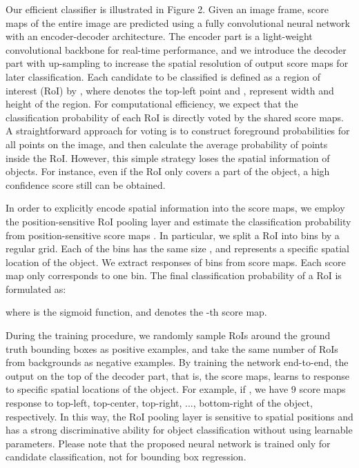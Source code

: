 \documentclass{article}
\begin{document}
Our efficient classifier is illustrated in Figure 2.
Given an image frame,
score maps of the entire image are predicted 
using a fully convolutional neural network with an encoder-decoder architecture.
The encoder part is a light-weight convolutional backbone for real-time performance,
and we introduce the decoder part with up-sampling to 
increase the spatial resolution of output score maps for later classification.
Each candidate to be classified is defined as a region of interest (RoI) by ,
where  denotes the top-left point and ,  represent width and height of the region.
For computational efficiency,
we expect that
the classification probability of each RoI is directly voted by the shared score maps.
A straightforward approach for voting is to construct foreground probabilities for all points on the image,
and then calculate the average probability of points inside the RoI.
However, this simple strategy loses the spatial information of objects.
For instance, even if the RoI only covers a part of the object,
a high confidence score still can be obtained.


In order to explicitly encode spatial information into the score maps, 
we employ the position-sensitive RoI pooling layer \cite{dai2016r}
and estimate the classification probability from  position-sensitive score maps .
In particular, we split a RoI into  bins by a regular grid.
Each of the bins has the same size ,
and represents a specific spatial location of the object.
We extract responses of  bins from  score maps.
Each score map only corresponds to one bin.
The final classification probability of a RoI  is formulated as:

where  is the sigmoid function, and  denotes the -th score map.

During the training procedure, 
we randomly sample RoIs around the ground truth bounding boxes as positive examples,
and take the same number of RoIs from backgrounds as negative examples. 
By training the network end-to-end, 
the output on the top of the decoder part, that is,
the  score maps, learns to response to specific spatial locations of the object.
For example, if , 
we have 9 score maps response to top-left, top-center, top-right, ..., bottom-right of the object, respectively.
In this way, the RoI pooling layer is sensitive to spatial positions 
and has a strong discriminative ability for object classification without using learnable parameters.
Please note that the proposed neural network is trained only for candidate classification, 
not for bounding box regression.
\end{document}
